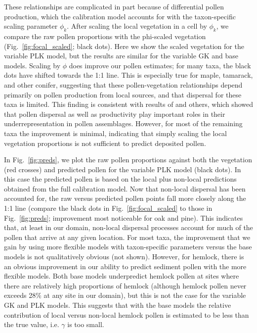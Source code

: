 \documentclass[12pt]{article}
\begin{document}
These relationships are complicated in part because of differential
pollen production, which the calibration model accounts for with the
taxon-specific scaling parameter $\phi_k$. After scaling the local
vegetation in a cell by $\phi_k$, we compare the raw pollen
proportions with the phi-scaled vegetation
(Fig.~\ref{fig:focal_scaled}; black dots). Here we show the scaled
vegetation for the variable PLK model, but the results are similar for
the variable GK and base models. Scaling by $\phi$ does improve our
pollen estimates; for many taxa, the black dots have shifted towards
the 1:1 line. This is especially true for maple, tamarack, and other
conifer, suggesting that these pollen-vegetation relationships depend
primarily on pollen production from local sources, and that dispersal
for these taxa is limited. This finding is consistent with results of
\citet{jackson1990, jackson1991pollen} and others, which showed that
pollen dispersal as well as productivity play important roles in their
underrepresentation in pollen assemblages. However, for most of the
remaining taxa the improvement is minimal, indicating that simply
scaling the local vegetation proportions is not sufficient to predict
deposited pollen.

In Fig.~\ref{fig:preds}, we plot the raw pollen proportions against
both the vegetation (red crosses) and predicted pollen for the
variable PLK model (black dots). In this case the predicted pollen is
based on the local plus non-local predictions obtained from the full
calibration model. Now that non-local dispersal has been accounted
for, the raw versus predicted pollen points fall more closely along
the 1:1 line (compare the black dots in Fig.~\ref{fig:focal_scaled} to
those in Fig.~\ref{fig:preds}; improvement most noticeable for oak and
pine). This indicates that, at least in our domain, non-local
dispersal processes account for much of the pollen that arrive at any
given location. For most taxa, the improvement that we gain by using
more flexible models with taxon-specific parameters versus the base
models is not qualitatively obvious (not shown). However, for hemlock,
there is an obvious improvement in our ability to predict sediment
pollen with the more flexible models. Both base models underpredict
hemlock pollen at sites where there are relatively high proportions of
hemlock (although hemlock pollen never exceeds 28\% at any site in our
domain), but this is not the case for the variable GK and PLK
models. This suggests that with the base models the relative
contribution of local versus non-local hemlock pollen is estimated to
be less than the true value, i.e. $\gamma$ is too small.
\end{document}
